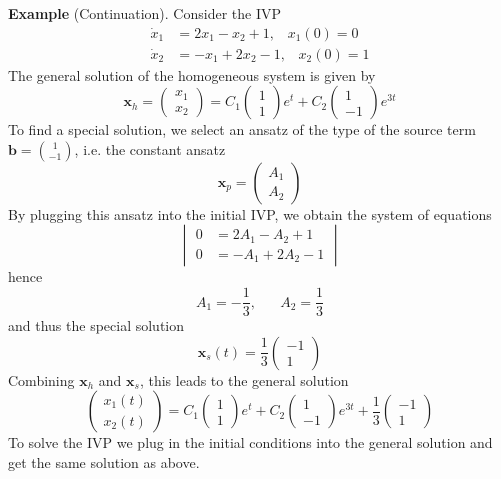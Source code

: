 \textbf{Example} (Continuation). Consider the IVP
\begin{equation}
  \begin{split}
    \dot{x}_1 &= 2x_1 - x_2 + 1, \;\;\; x_1(0) = 0\\
    \dot{x}_2 &= -x_1 + 2x_2 - 1, \;\;\; x_2(0) = 1
  \end{split}
\end{equation}
The general solution of the homogeneous system is given by
\begin{equation}
  \mathbf{x}_h = \begin{pmatrix} x_1 \\ x_2 \end{pmatrix} =
  C_1 \begin{pmatrix} 1 \\ 1 \end{pmatrix} e^t +
  C_2 \begin{pmatrix} 1 \\ -1\end{pmatrix} e^{3t}
\end{equation}
To find a special solution, we select an ansatz of the type of the source term $\mathbf{b} = \binom{1}{-1}$, i.e. the constant ansatz
\begin{equation}
  \mathbf{x}_p = \begin{pmatrix} A_1 \\ A_2 \end{pmatrix}
\end{equation}
By plugging this ansatz into the initial IVP, we obtain the system of equations
\begin{equation}
  \begin{vmatrix}
    0 &= 2A_1 - A_2 + 1\\
    0 &= -A_1 + 2A_2 - 1
  \end{vmatrix}
\end{equation}
hence
\begin{equation}
  A_1 = -\frac{1}{3}, \;\;\;\;\;\; A_2 = \frac{1}{3}
\end{equation}
and thus the special solution
\begin{equation}
  \mathbf{x}_s(t) = \frac{1}{3} \begin{pmatrix} -1 \\ 1 \end{pmatrix}
\end{equation}
Combining $\mathbf{x}_h$ and $\mathbf{x}_s$, this leads to the general solution
\begin{equation}
  \begin{pmatrix} x_1(t) \\ x_2(t) \end{pmatrix} =
  C_1 \begin{pmatrix} 1 \\ 1 \end{pmatrix} e^t +
  C_2 \begin{pmatrix} 1 \\ -1\end{pmatrix} e^{3t} +
  \frac{1}{3} \begin{pmatrix} -1 \\ 1 \end{pmatrix}
\end{equation}
To solve the IVP we plug in the initial conditions into the general solution and get the same solution as above.

